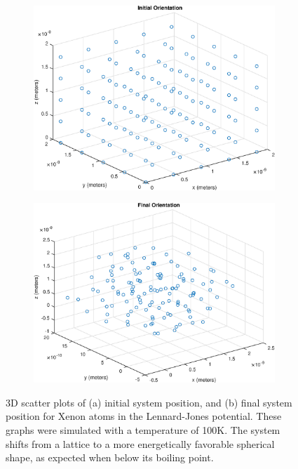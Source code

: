 \documentclass[12pt]{article}
\begin{document}
\begin{figure}[!h]
\begin{subfigure}{0.5\textwidth}
\includegraphics[width=0.9\linewidth]{./finalpics/LJinitial.eps}
\caption{\label{LJinitial}}
\end{subfigure}
\begin{subfigure}{0.5\textwidth}
\includegraphics[width=0.9\linewidth]{./finalpics/LJfinal.eps}
\caption{\label{LJfinal}}
\end{subfigure}
\caption{3D scatter plots of (a) initial system position, and (b) final system position for Xenon atoms in the Lennard-Jones potential.  These graphs were simulated with a temperature of 100K.  The system shifts from a lattice to a more energetically favorable spherical shape, as expected when below its boiling point.} 
\end{figure}
\end{document}

